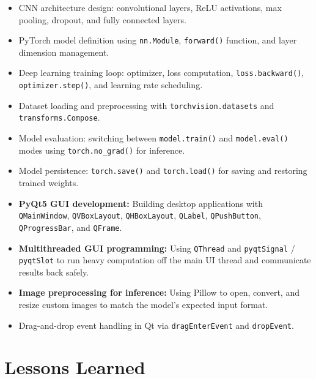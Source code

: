 \documentclass[12pt,a4paper,openany]{report}
\begin{document}
\begin{itemize}
    \item CNN architecture design: convolutional layers, ReLU activations, max pooling, dropout, and fully connected layers.
    \item PyTorch model definition using \texttt{nn.Module}, \texttt{forward()} function, and layer dimension management.
    \item Deep learning training loop: optimizer, loss computation, \texttt{loss.backward()}, \texttt{optimizer.step()}, and learning rate scheduling.
    \item Dataset loading and preprocessing with \texttt{torchvision.datasets} and \texttt{transforms.Compose}.
    \item Model evaluation: switching between \texttt{model.train()} and \texttt{model.eval()} modes using \texttt{torch.no\_grad()} for inference.
    \item Model persistence: \texttt{torch.save()} and \texttt{torch.load()} for saving and restoring trained weights.
    \item \textbf{PyQt5 GUI development:} Building desktop applications with \texttt{QMainWindow}, \texttt{QVBoxLayout}, \texttt{QHBoxLayout}, \texttt{QLabel}, \texttt{QPushButton}, \texttt{QProgressBar}, and \texttt{QFrame}.
    \item \textbf{Multithreaded GUI programming:} Using \texttt{QThread} and \texttt{pyqtSignal} / \texttt{pyqtSlot} to run heavy computation off the main UI thread and communicate results back safely.
    \item \textbf{Image preprocessing for inference:} Using Pillow to open, convert, and resize custom images to match the model's expected input format.
    \item Drag-and-drop event handling in Qt via \texttt{dragEnterEvent} and \texttt{dropEvent}.
\end{itemize}

\section{Lessons Learned}
\end{document}
